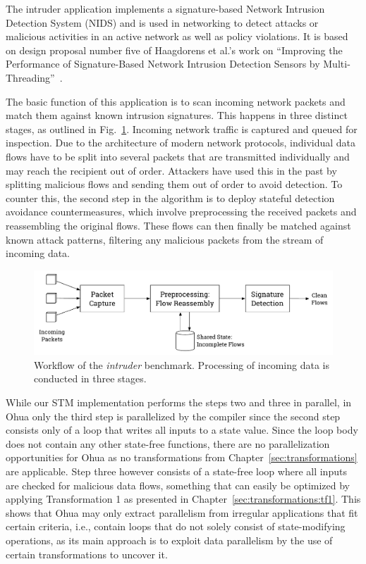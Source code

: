 The intruder application implements a signature-based Network Intrusion Detection System (NIDS) and is used in networking to detect attacks or malicious activities in an active network as well as policy violations.
It is based on design proposal number five of Haagdorens et al.'s work on \enquote{Improving the Performance of Signature-Based Network Intrusion Detection Sensors by Multi-Threading}~\cite{haagdorens2004improving}.

The basic function of this application is to scan incoming network packets and match them against known intrusion signatures.
This happens in three distinct stages, as outlined in Fig.~\ref{fig:experiments:intruder:workflow}.
Incoming network traffic is captured and queued for inspection.
Due to the architecture of modern network protocols, individual data flows have to be split into several packets that are transmitted individually and may reach the recipient out of order.
Attackers have used this in the past by splitting malicious flows and sending them out of order to avoid detection.
To counter this, the second step in the algorithm is to deploy stateful detection avoidance countermeasures, which involve preprocessing the received packets and reassembling the original flows.
These flows can then finally be matched against known attack patterns, filtering any malicious packets from the stream of incoming data.

\begin{figure}
    \includegraphics[width=\textwidth,keepaspectratio]{gfx/experiments-intruder}
    \caption{Workflow of the \emph{intruder} benchmark. Processing of incoming data is conducted in three stages.}%
    \label{fig:experiments:intruder:workflow}
\end{figure}

While our STM implementation performs the steps two and three in parallel, in Ohua only the third step is parallelized by the compiler since the second step consists only of a loop that writes all inputs to a state value.
Since the loop body does not contain any other state-free functions, there are no parallelization opportunities for Ohua as no transformations from Chapter~\ref{sec:transformations} are applicable.
Step three however consists of a state-free loop where all inputs are checked for malicious data flows, something that can easily be optimized by applying Transformation 1 as presented in Chapter~\ref{sec:transformations:tf1}.
This shows that Ohua may only extract parallelism from irregular applications that fit certain criteria, i.e., contain loops that do not solely consist of state-modifying operations, as its main approach is to exploit data parallelism by the use of certain transformations to uncover it.

